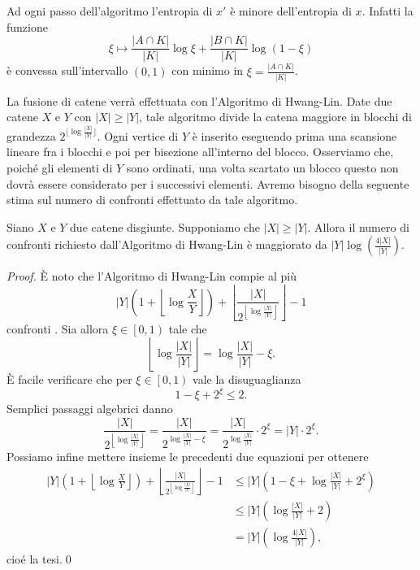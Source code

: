 \begin{remark}
	Ad ogni passo dell'algoritmo l'entropia di \(x'\) \`e minore dell'entropia di \(x\). Infatti la funzione
	\[ \xi \mapsto \frac{|A\cap K|}{|K|}\log{\xi} + \frac{|B\cap K|}{|K|}\log{(1-\xi)} \]
	\`e convessa sull'intervallo \((0,1)\) con minimo in \(\xi = \frac{|A\cap K|}{|K|}\). 
\end{remark}
La fusione di catene verr\`a effettuata con l'Algoritmo di Hwang-Lin. Date due catene \(X\) e \(Y\) con \(|X|\ge|Y|\), tale algoritmo divide la catena maggiore in blocchi di grandezza \(2^{\lfloor\log{\frac{|X|}{|Y|}}\rfloor}\). Ogni vertice di \(Y\) \`e inserito eseguendo prima una scansione lineare fra i blocchi e poi per bisezione all'interno del blocco. Osserviamo che, poich\'e gli elementi di \(Y\) sono ordinati, una volta scartato un blocco questo non dovr\`a essere considerato per i successivi elementi. Avremo bisogno della seguente stima sul numero di confronti effettuato da tale algoritmo. 
\begin{lemma}
	\label{hwanglinlemma} Siano \(X\) e \(Y\) due catene disgiunte. Supponiamo che \(|X|\ge|Y|\). Allora il numero di confronti richiesto dall'Algoritmo di Hwang-Lin è maggiorato da \(|Y|\log(\frac{4|X|}{|Y|})\). 
\end{lemma}
\begin{proof}
	È noto che l'Algoritmo di Hwang-Lin compie al più
	\[|Y|\left(1+\left\lfloor{\log{\frac{X}{Y}}}\right\rfloor\right)+\left\lfloor\frac{|X|}{2^{\left\lfloor\log{\frac{|X|}{|Y|}}\right\rfloor}}\right\rfloor-1\]
	confronti \cite{Hwang1972}. Sia allora \(\xi\in\left[0,1\right)\) tale che
	\[\left\lfloor\log{\frac{|X|}{|Y|}}\right\rfloor=\log{\frac{|X|}{|Y|}}-\xi.\]
	È facile verificare che per \(\xi\in\left[0,1\right)\) vale la disuguaglianza
	\[1-\xi+2^{\xi}\le 2.\]
	Semplici passaggi algebrici danno
	\[\frac{|X|}{2^{\left\lfloor\log{\frac{|X|}{|Y|}}\right\rfloor}}=\frac{|X|}{2^{\log{\frac{|X|}{|Y|}}-\xi}}=\frac{|X|}{2^{\log{\frac{|X|}{|Y|}}}}\cdot 2^{\xi}=|Y|\cdot 2^{\xi}.\]
	Possiamo infine mettere insieme le precedenti due equazioni per ottenere 
	\begin{align}
		|Y|\left(1+\left\lfloor{\log{\frac{X}{Y}}}\right\rfloor\right)+\left\lfloor\frac{|X|}{2^{\left\lfloor\log{\frac{|X|}{|Y|}}\right\rfloor}}\right\rfloor-1&\le|Y|\left(1-\xi+\log{\frac{|X|}{|Y|}}+2^{\xi}\right) \nonumber \\
		&\le |Y|\left(\log{\frac{|X|}{|Y|}}+2\right) \nonumber \\
		&= |Y|\left(\log{\frac{4|X|}{|Y|}}\right), \nonumber 
	\end{align}
	cioé la tesi.\qed 
\end{proof}
